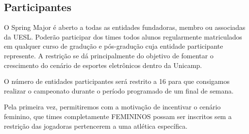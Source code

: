 \subsection{Participantes}

O Spring Major é aberto a todas as entidades fundadoras, membro ou associadas da UESL. Poderão participar dos times todos alunos regularmente matriculados em qualquer curso de gradução e pós-gradução cuja entidade participante represente. A restrição se dá principalmente do objetivo de fomentar o crescimento do cenário de esportes eletrônicos dentro da Unicamp.

O número de entidades participantes será restrito a 16 para que consigamos realizar o campeonato durante o período programado de um final de semana.

Pela primeira vez, permitiremos com a motivação de incentivar o cenário feminino, que times completamente FEMININOS possam ser inscritos sem a restrição das jogadoras pertencerem a uma atlética específica.